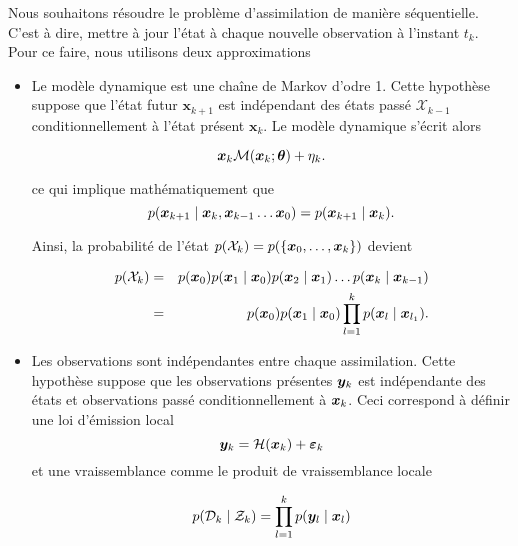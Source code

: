 Nous souhaitons résoudre le problème d'assimilation de manière séquentielle. C'est à dire, mettre à jour l'état à chaque nouvelle observation à l'instant $t_k$. Pour ce faire, nous utilisons deux approximations

\begin{itemize}
    \item Le modèle dynamique est une chaîne de Markov d'odre 1. Cette hypothèse suppose que l'état futur $\bm x_{k+1}$ est indépendant des états passé $\mathcal X_{k-1}$ conditionnellement à l'état présent $\bm x_{k}$. Le modèle dynamique s'écrit alors

          \begin{equation*}
              \bm x_k \mathcal{M}(\bm{x}_k ; \bm \theta) + \eta_k.
          \end{equation*}

          ce qui implique mathématiquement que
          \begin{equation*}
              p(\bx_{k+1} \mid \bx_{k},\bx_{k-1}\dots \bx_{0}) = p(\bx_{k+1} \mid \bx_{k}).
          \end{equation*}

          Ainsi, la probabilité de l'état $p(\mathcal{X}_k)=p(\{\bm{x}_0, \dots, \bm{x}_k\})$ devient

          \begin{eqnarray*}
              p(\mathcal{X}_k) &=& p(\bm{x}_0) p(\bm{x}_1 \mid \bm{x}_0) p(\bm{x}_2 \mid \bm{x}_1) \dots p(\bm{x}_k \mid \bm{x}_{k-1}) \\
              &=& p(\bm{x}_0) p(\bm{x}_1 \mid \bm{x}_0) \prod_{l = 1}^{k} p(\bm{x}_l \mid \bm{x}_{l_1}).
          \end{eqnarray*}

    \item Les observations sont indépendantes entre chaque assimilation. Cette hypothèse suppose que les observations présentes $\bm{y}_k$ est indépendante des états et observations passé conditionnellement à $\bm{x}_k$. Ceci correspond à définir une loi d'émission local
          \begin{equation*}
              \bm{y}_k = \mathcal H (\bm{x}_k) + \bm{\varepsilon}_k
          \end{equation*}
          et une vraissemblance comme le produit de vraissemblance locale

          \begin{equation*}
              p(\mathcal{D}_k \mid \mathcal Z_k) = \prod_{l=1}^{k} p(\bm{y}_l \mid \bm{x}_l)
          \end{equation*}
\end{itemize}

